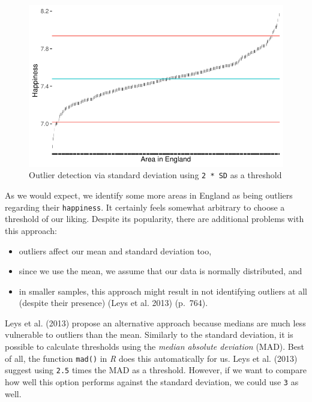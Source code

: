 \documentclass[
  letterpaper,
  DIV=11,
  numbers=noendperiod]{scrreprt}
\begin{document}
\begin{figure}[H]

{\centering \includegraphics{09_sources_of_bias_files/figure-latex/outlier-detection-two-sd-1.pdf}

}

\caption{Outlier detection via standard deviation using
\texttt{2\ *\ SD} as a threshold}

\end{figure}%

As we would expect, we identify some more areas in England as being
outliers regarding their \texttt{happiness}. It certainly feels somewhat
arbitrary to choose a threshold of our liking. Despite its popularity,
there are additional problems with this approach:

\begin{itemize}
\item
  outliers affect our mean and standard deviation too,
\item
  since we use the mean, we assume that our data is normally
  distributed, and
\item
  in smaller samples, this approach might result in not identifying
  outliers at all (despite their presence) (Leys et al. 2013) (p.~764).
\end{itemize}

Leys et al. (2013) propose an alternative approach because medians are
much less vulnerable to outliers than the mean. Similarly to the
standard deviation, it is possible to calculate thresholds using the
\emph{median absolute deviation} (MAD). Best of all, the function
\texttt{mad()} in \emph{R} does this automatically for us. Leys et al.
(2013) suggest using \texttt{2.5} times the MAD as a threshold. However,
if we want to compare how well this option performs against the standard
deviation, we could use \texttt{3} as well.
\end{document}
